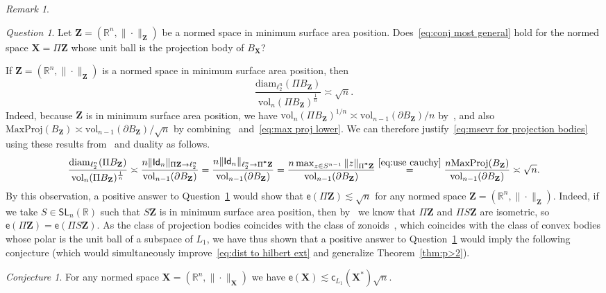 \documentclass[11pt,reqno]{amsart}
\newcommand{\diam}{\mathrm{diam}}
\newcommand{\cc}{\mathsf{c}}
\newcommand{\X}{\mathbf X}
\newcommand{\R}{\mathbb R}
\theoremstyle{remark}
\newtheorem{remark}[theorem]{Remark}
\newtheorem{conjecture}[theorem]{Conjecture}
\newtheorem{question}[theorem]{Question}
\newcommand{\Id}{\mathsf{Id}}
\newcommand{\SL}{\mathsf{SL}}
\newcommand{\ee}{\mathsf{e}}
\newcommand{\bfZ}{\mathbf{Z}}
\newcommand{\vol}{\mathrm{vol}}
\renewcommand{\1}{\mathbf 1}
\begin{document}
\begin{remark}
\begin{question}\label{Q:question zonoid l2 diam} Let $\bfZ=(\R^n,\|\cdot\|_\bfZ)$ be a normed space in minimum surface area position. Does~\eqref{eq:conj most general} hold for the normed space $\X=\Pi\bfZ$ whose unit ball is the projection body of $B_\X$?
\end{question}
If $\bfZ=(\R^n,\|\cdot\|_\bfZ)$ is a normed space in minimum surface area position, then
\begin{equation}\label{eq:msevr for projection bodies}
\frac{\diam_{\ell_2^n}(\Pi B_\bfZ)}{\vol_n(\Pi B_\bfZ)^{\frac{1}{n}}}\asymp \sqrt{n}.
\end{equation}
Indeed, because $\bfZ$ is in minimum surface area position, we have $\vol_n(\Pi B_\bfZ)^{1/n}\asymp \vol_{n-1}(\partial B_\bfZ)/n$ by~\cite[Corollary~3.4]{GP99}, and also $\mathrm{MaxProj}(B_\bfZ)\asymp \vol_{n-1}(\partial B_\bfZ)/\sqrt{n}$  by combining~\cite[Proposition~3.1]{GP99} and~\eqref{eq:max proj lower}.  We can therefore justify~\eqref{eq:msevr for projection bodies} using these results from~\cite{GP99} and duality as follows.
$$
\frac{\diam_{\ell_2^n}(\Pi B_\bfZ)}{\vol_n(\Pi B_\bfZ)^{\frac{1}{n}}}\asymp \frac{n\|\Id_n\|_{\Pi\bfZ\to \ell_2^n}}{\vol_{n-1}(\partial B_\bfZ)}=
\frac{n\|\Id_n\|_{ \ell_2^n\to \Pi^{\textbf *}\bfZ}}{\vol_{n-1}(\partial B_\bfZ)}=\frac{n\max_{z\in S^{n-1}} \|z\|_{\Pi^{\textbf *}\bfZ}}{\vol_{n-1}(\partial B_\bfZ)}\stackrel{\eqref{eq:use cauchy}}{=} \frac{n\mathrm{MaxProj}(B_\bfZ)}{\vol_{n-1}(\partial B_\bfZ)}\asymp\sqrt{n}.
$$
By this observation,  a positive answer to Question~\ref{Q:question zonoid l2 diam} would show that $\ee(\Pi\bfZ)\lesssim \sqrt{n}$ for any normed space $\bfZ=(\R^n,\|\cdot\|_\bfZ)$. Indeed, if we take  $S\in \SL_n(\R)$ such that $S\bfZ$ is in minimum surface area position, then by~\cite{Pet67} we know that $\Pi \bfZ$ and $\Pi S\bfZ$ are isometric, so   $\ee(\Pi \bfZ)=\ee(\Pi S\bfZ)$. As the class of projection bodies coincides with the class of zonoids~\cite{Bol69,Sch83}, which coincides with the class of convex bodies whose polar is the unit ball of a subspace of $L_1$, we have thus shown that a positive answer to Question~\ref{Q:question zonoid l2 diam} would imply  the following conjecture (which would simultaneously improve~\eqref{eq:dist to hilbert ext} and generalize Theorem~\ref{thm:p>2}).
\begin{conjecture}\label{conj:zonoids} For any normed space $\X=(\R^n,\|\cdot\|_\X)$ we have $\ee(\X)\lesssim \cc_{L_1}(\X^*)\sqrt{n}.$
\end{conjecture}

\end{remark}
\end{document}
